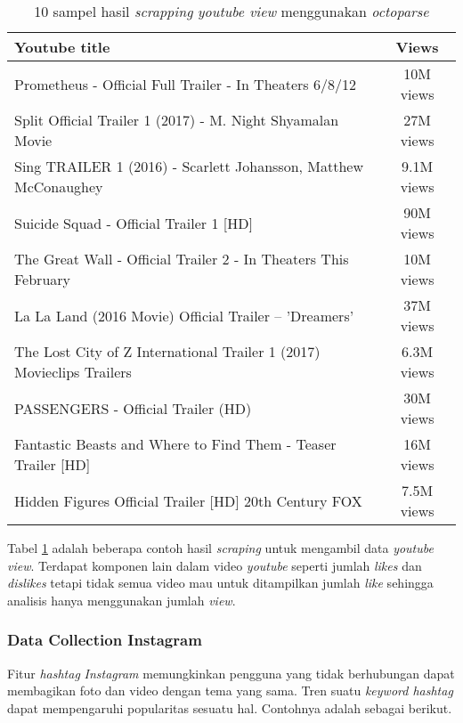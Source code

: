 \begin{table}[H]
\centering
\caption{10 sampel hasil \textit{scrapping} \textit{youtube view} menggunakan \textit{octoparse}} 
\begin{tabular}{|l|c|}
\hline 
\textbf{Youtube title} &\textbf{ Views} \\ 
\hline 
Prometheus - Official Full Trailer - In Theaters 6/8/12
 & 10M views
 \\ 
\hline 
Split Official Trailer 1 (2017) - M. Night Shyamalan Movie
 & 27M views
 \\ 
\hline 
Sing TRAILER 1 (2016) - Scarlett Johansson, Matthew McConaughey 
 & 9.1M views
 \\ 
\hline 
Suicide Squad - Official Trailer 1 [HD]
 & 90M views
 \\ 
\hline 
The Great Wall - Official Trailer 2 - In Theaters This February
 & 10M views
 \\ 
\hline 
La La Land (2016 Movie) Official Trailer – 'Dreamers'
 & 37M views
 \\ 
\hline 
The Lost City of Z International Trailer 1 (2017)  Movieclips Trailers
 & 6.3M views
 \\ 
\hline 
PASSENGERS - Official Trailer (HD) & 30M views
 \\ 
\hline 
Fantastic Beasts and Where to Find Them - Teaser Trailer [HD]
 & 16M views
 \\ 
\hline 
Hidden Figures  Official Trailer [HD]  20th Century FOX
 & 7.5M views
 \\ 
\hline 
\end{tabular} 

\label{tab:10sampelhasil_scrapyoutubeview}
\end{table}

Tabel \ref{tab:10sampelhasil_scrapyoutubeview} adalah beberapa contoh hasil \textit{scraping} untuk mengambil data \textit{youtube view}. Terdapat komponen lain dalam video \textit{youtube} seperti jumlah \textit{likes} dan \textit{dislikes} tetapi tidak semua video mau untuk ditampilkan jumlah \textit{like} sehingga analisis hanya menggunakan jumlah \textit{view}.

\subsubsection{Data Collection Instagram}
Fitur \textit{hashtag} \textit{Instagram} memungkinkan pengguna yang tidak berhubungan dapat membagikan foto dan video dengan tema yang sama. Tren suatu \textit{keyword hashtag} dapat mempengaruhi popularitas sesuatu hal. Contohnya adalah sebagai berikut.



